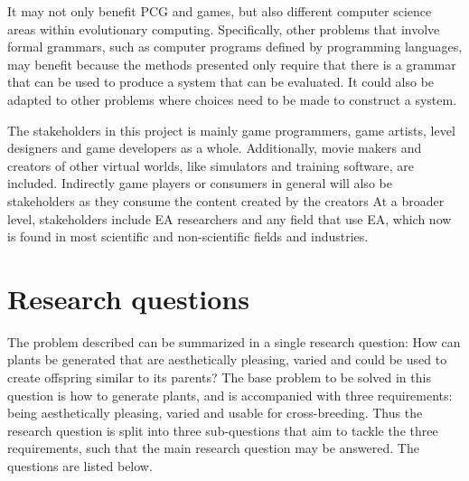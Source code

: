 It may not only benefit \gls{PCG} and games, but also different computer science areas within evolutionary computing.
Specifically, other problems that involve formal grammars, such as computer programs defined by programming languages, may benefit because the methods presented only require that there is a grammar that can be used to produce a system that can be evaluated.
It could also be adapted to other problems where choices need to be made to construct a system.

The stakeholders in this project is mainly game programmers, game artists, level designers and game developers as a whole.
Additionally, movie makers and creators of other virtual worlds, like simulators and training software, are included.
Indirectly game players or consumers in general will also be stakeholders as they consume the content created by the creators
At a broader level, stakeholders include \gls{EA} researchers and any field that use \gls{EA}, which now is found in most scientific and non-scientific fields and industries. %

\section{Research questions}
The problem described can be summarized in a single research question: How can plants be generated that are aesthetically pleasing, varied and could be used to create offspring similar to its parents?
The base problem to be solved in this question is how to generate plants, and is accompanied with three requirements: being aesthetically pleasing, varied and usable for cross-breeding.
Thus the research question is split into three sub-questions that aim to tackle the three requirements, such that the main research question may be answered.
The questions are listed below.


